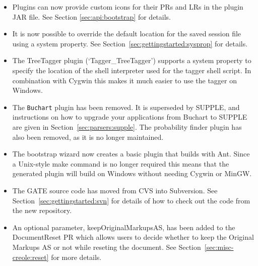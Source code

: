 \begin{itemize}
\item Plugins can now provide custom icons for their PRs and LRs in the plugin
  JAR file.  See Section \ref{sec:api:bootstrap} for details.

\item It is now possible to override the default location for the saved session
  file using a system property.  See Section~\ref{sec:gettingstarted:sysprop} for
  details.

\item The TreeTagger plugin (`Tagger\_TreeTagger') supports a system property
to specify the location of the shell interpreter used for the tagger shell
script.  In combination
  with Cygwin this makes it much easier to use the tagger on Windows.  

\item The {\tt Buchart} plugin has been removed.  It is superseded by SUPPLE,
  and instructions on how to upgrade your applications from Buchart to SUPPLE
  are given in Section~\ref{sec:parsers:supple}.  The probability finder
  plugin has also been removed, as it is no longer maintained.

\item The bootstrap wizard now creates a basic plugin that builds with Ant.
  Since a Unix-style make command is no longer required this means that the
  generated plugin will build on Windows without needing Cygwin or MinGW.

\item The GATE source code has moved from CVS into Subversion.  See
  Section~\ref{sec:gettingstarted:svn} for details of how to check out the code from the
  new repository.

\item An optional parameter, keepOriginalMarkupsAS, has been added to the
  DocumentReset PR which allows users to decide whether to keep the Original
  Markups AS or not while reseting the document. See
  Section~\ref{sec:misc-creole:reset} for more details.

\end{itemize}

